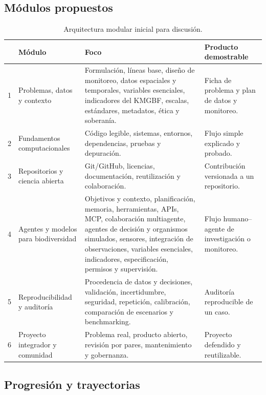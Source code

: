 \documentclass[11pt,a4paper]{article}
\begin{document}
\subsection{Módulos propuestos}

\begin{table}[ht]
\centering
\small
\begin{tabularx}{\textwidth}{@{}p{0.8cm}p{4.0cm}X p{3.2cm}@{}}
\toprule
 & \textbf{Módulo} & \textbf{Foco} & \textbf{Producto demostrable}\\
\midrule
1 & Problemas, datos y contexto &
Formulación, líneas base, diseño de monitoreo, datos espaciales y temporales,
variables esenciales, indicadores del KMGBF, escalas, estándares, metadatos,
ética y soberanía. &
Ficha de problema y plan de datos y monitoreo.\\
2 & Fundamentos computacionales &
Código legible, sistemas, entornos, dependencias, pruebas y depuración. &
Flujo simple explicado y probado.\\
3 & Repositorios y ciencia abierta &
Git/GitHub, licencias, documentación, reutilización y colaboración. &
Contribución versionada a un repositorio.\\
4 & Agentes y modelos para biodiversidad &
Objetivos y contexto, planificación, memoria, herramientas, APIs, MCP,
colaboración multiagente, agentes de decisión y organismos simulados,
sensores, integración de observaciones, variables esenciales, indicadores,
especificación, permisos y supervisión. &
Flujo humano--agente de investigación o monitoreo.\\
5 & Reproducibilidad y auditoría &
Procedencia de datos y decisiones, validación, incertidumbre, seguridad,
repetición, calibración, comparación de escenarios y benchmarking. &
Auditoría reproducible de un caso.\\
6 & Proyecto integrador y comunidad &
Problema real, producto abierto, revisión por pares, mantenimiento y gobernanza. &
Proyecto defendido y reutilizable.\\
\bottomrule
\end{tabularx}
\caption{Arquitectura modular inicial para discusión.}
\end{table}

\subsection{Progresión y trayectorias}
\end{document}
